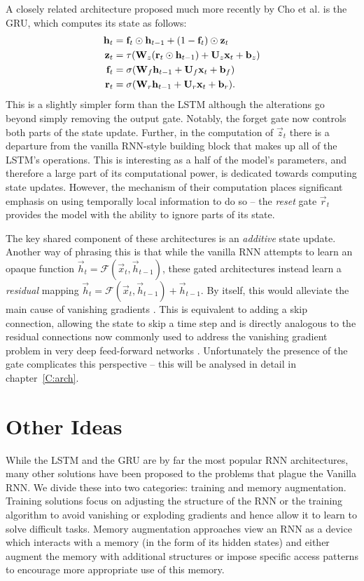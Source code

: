 A closely related architecture proposed much more recently by Cho et al. \autocite{Cho2014} is the
GRU, which computes its state as follows:
\begin{align}\label{eq:GRU}
	\mathbf{h}_t &= \mathbf{f}_t \odot \mathbf{h}_{t-1} + (1 - \mathbf{f}_t)\odot\mathbf{z}_t\\
	\mathbf{z}_t &= \tau(\mathbf{W}_z(\mathbf{r}_t \odot \mathbf{h}_{t-1}) + \mathbf{U}_z\mathbf{x}_t + \mathbf{b}_z)\\
	\mathbf{f}_t &= \sigma(\mathbf{W}_f\mathbf{h}_{t-1} + \mathbf{U}_f\mathbf{x}_t + \mathbf{b}_f)\\
	\mathbf{r}_t &= \sigma(\mathbf{W}_r\mathbf{h}_{t-1} + \mathbf{U}_r\mathbf{x}_t + \mathbf{b}_r).
\end{align} This is a slightly simpler form than the LSTM although the alterations go beyond
simply removing the output gate. Notably, the forget gate now controls both parts of the state
update. Further, in the computation of \(\vec{z}_t\) there is a departure from the vanilla
RNN-style building block that makes up all of the LSTM's operations. This is interesting as a
half of the model's parameters, and therefore a large part of its computational power, is
dedicated towards computing state updates. However, the mechanism of their computation places
significant emphasis on using temporally local information to do so -- the \emph{reset} gate
\(\vec{r}_t\) provides the model with the ability to ignore parts of its state.

The key shared component of these architectures is an \emph{additive} state update. Another way
of phrasing this is that while the vanilla RNN attempts to learn an opaque function
\(\vec{h}_t = \mathcal{F}(\vec{x}_t, \vec{h}_{t-1})\), these gated architectures instead learn
a \emph{residual} mapping \(\vec{h}_t = \mathcal{F}(\vec{x}_t, \vec{h}_{t-1}) + \vec{h}_{t-1}\).
By itself, this would alleviate the main cause of vanishing gradients 
\autocite{Jozefowicz2015, Hochreiter1997}. This is equivalent to adding a skip connection,
allowing the state to skip a time step and is directly analogous to the residual connections
now commonly used to address the vanishing gradient problem in very deep feed-forward networks
\autocite{He2015, Duvenaud2014, Szegedy2016}. Unfortunately the presence of the gate complicates
this perspective -- this will be analysed in detail in chapter~\ref{C:arch}.


\section{Other Ideas}
While the LSTM and the GRU are by far the most popular RNN architectures, many other solutions
have been proposed to the problems that plague the Vanilla RNN. We divide these into two categories:
training and memory augmentation. Training solutions focus on adjusting the structure of the RNN or
the training algorithm to avoid vanishing or exploding gradients and hence allow it to learn to solve
difficult tasks. Memory augmentation approaches view an RNN as a device which interacts with a
memory (in the form of its hidden states) and either augment the memory with additional
structures or impose specific access patterns to encourage more appropriate use of this memory.

